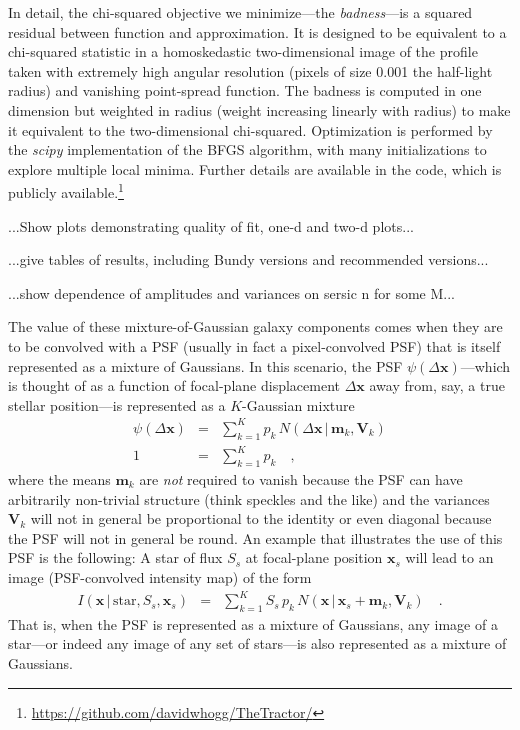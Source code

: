 \documentclass[12pt,pdftex,preprint]{aastex}
\newcommand{\project}[1]{\textsl{#1}}
\newcommand{\tmatrix}[1]{\boldsymbol{#1}}
\newcommand{\tvector}[1]{\boldsymbol{#1}}
\newcommand{\pos}{\tvector{x}}
\newcommand{\mean}{\tvector{m}}
\newcommand{\var}{\tmatrix{V}\!}
\newcommand{\normal}{N}
\newcommand{\given}{\,|\,}
\renewcommand{\star}{\mathrm{star}}
\begin{document}
In detail, the chi-squared objective we minimize---the
\emph{badness}---is a squared residual between function and
approximation.  It is designed to be equivalent to a chi-squared
statistic in a homoskedastic two-dimensional image of the profile
taken with extremely high angular resolution (pixels of size 0.001 the
half-light radius) and vanishing point-spread function.  The badness
is computed in one dimension but weighted in radius (weight increasing
linearly with radius) to make it equivalent to the two-dimensional
chi-squared.  Optimization is performed by the \project{scipy}
implementation of the BFGS algorithm, with many initializations to
explore multiple local minima.  Further details are available in the
code, which is publicly
available.\footnote{\url{https://github.com/davidwhogg/TheTractor/}}

...Show plots demonstrating quality of fit, one-d and two-d plots...

...give tables of results, including Bundy versions and recommended versions...

...show dependence of amplitudes and variances on sersic n for some M...

The value of these mixture-of-Gaussian galaxy components comes when
they are to be convolved with a PSF (usually in fact a pixel-convolved
PSF) that is itself represented as a mixture of Gaussians.  In this
scenario, the PSF $\psi(\Delta\pos)$---which is thought of as a
function of focal-plane displacement $\Delta\pos$ away from, say, a
true stellar position---is represented as a $K$-Gaussian mixture
\begin{eqnarray}\displaystyle
\psi(\Delta\pos) &=& \sum_{k=1}^K p_k\,\normal(\Delta\pos\given\mean_k,\var_k)
\\
1 &=& \sum_{k=1}^K p_k
\quad ,
\end{eqnarray}
where the means $\mean_k$ are \emph{not} required to vanish because
the PSF can have arbitrarily non-trivial structure (think speckles and
the like) and the variances $\var_k$ will not in general be
proportional to the identity or even diagonal because the PSF will not
in general be round.  An example that illustrates the use of this PSF
is the following: A star of flux $S_s$ at focal-plane position
$\pos_s$ will lead to an image (PSF-convolved intensity map) of the
form
\begin{eqnarray}\displaystyle
I(\pos\given\star,S_s,\pos_s) &=& \sum_{k=1}^K S_s\,p_k\,\normal(\pos\given\pos_s+\mean_k,\var_k)
\quad .
\end{eqnarray}
That is, when the PSF is represented as a mixture of Gaussians, any
image of a star---or indeed any image of any set of stars---is also
represented as a mixture of Gaussians.
\end{document}
